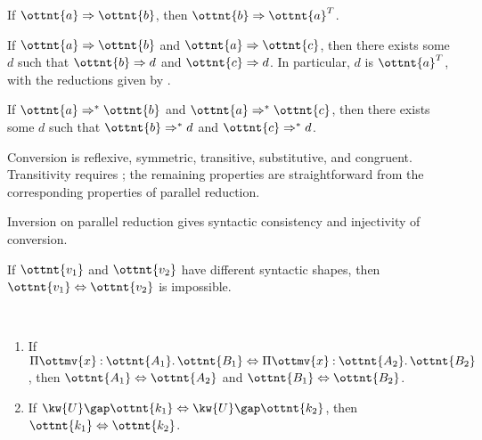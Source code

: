 \documentclass[a4paper,UKenglish,cleveref,autoref,thm-restate]{lipics-v2021}
\begin{document}
\begin{lemma}[Completion (p.r.)] \label{lem:par:compl}
  If $ \ottnt{a}  \Rightarrow  \ottnt{b} $, then $ \ottnt{b}  \Rightarrow   \ottnt{a} ^{ \mathsf{T} }  $.
\end{lemma}

\begin{corollary}[Diamond (p.r.)] \label{lem:par:diamond}
  If $ \ottnt{a}  \Rightarrow  \ottnt{b} $ and $ \ottnt{a}  \Rightarrow  \ottnt{c} $,
  then there exists some $d$ such that $ \ottnt{b}  \Rightarrow  d $ and $ \ottnt{c}  \Rightarrow  d $.
  In particular, $d$ is $ \ottnt{a} ^{ \mathsf{T} } $,
  with the reductions given by .
\end{corollary}

\begin{theorem}[Confluence (p.r.)] \label{lem:par:confl}
  If $ \ottnt{a}  \Rightarrow^\ast  \ottnt{b} $ and $ \ottnt{a}  \Rightarrow^\ast  \ottnt{c} $,
  then there exists some $d$ such that $ \ottnt{b}  \Rightarrow^\ast  d $ and $ \ottnt{c}  \Rightarrow^\ast  d $.
\end{theorem}

\begin{corollary} \label{lem:conv}
  Conversion is reflexive, symmetric, transitive, substitutive, and congruent.
  Transitivity requires ;
  the remaining properties are straightforward
  from the corresponding properties of parallel reduction.
\end{corollary}

Inversion on parallel reduction gives syntactic consistency and injectivity of conversion.

\begin{lemma}
  If $\ottnt{v_{{\mathrm{1}}}}$ and $\ottnt{v_{{\mathrm{2}}}}$ have different syntactic shapes,
  then $ \ottnt{v_{{\mathrm{1}}}}  \Leftrightarrow  \ottnt{v_{{\mathrm{2}}}} $ is impossible.
\end{lemma}

\begin{lemma} ~
  \begin{enumerate}[topsep=0pt]
    \item If $  \Pi  \ottmv{x}  \mathbin{:}  \ottnt{A_{{\mathrm{1}}}}  \mathpunct{.}  \ottnt{B_{{\mathrm{1}}}}   \Leftrightarrow   \Pi  \ottmv{x}  \mathbin{:}  \ottnt{A_{{\mathrm{2}}}}  \mathpunct{.}  \ottnt{B_{{\mathrm{2}}}}  $, then $ \ottnt{A_{{\mathrm{1}}}}  \Leftrightarrow  \ottnt{A_{{\mathrm{2}}}} $ and $ \ottnt{B_{{\mathrm{1}}}}  \Leftrightarrow  \ottnt{B_{{\mathrm{2}}}} $.
    \item If $  \kw{U} \gap  \ottnt{k_{{\mathrm{1}}}}   \Leftrightarrow   \kw{U} \gap  \ottnt{k_{{\mathrm{2}}}}  $, then $ \ottnt{k_{{\mathrm{1}}}}  \Leftrightarrow  \ottnt{k_{{\mathrm{2}}}} $.
  \end{enumerate}
\end{lemma}
\end{document}
